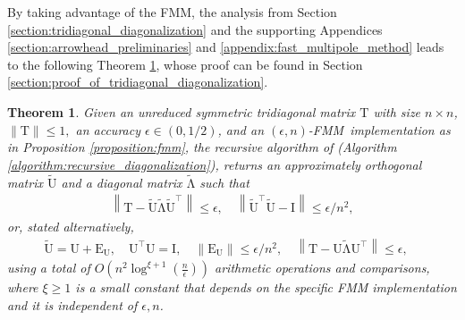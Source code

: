 \documentclass{article}
\newcommand{\lnorm}{\left\|}
\newcommand{\rnorm}{\right\|}
\newcommand{\lpar}{\left(}
\newcommand{\rpar}{\right)}
\newtheorem{theorem}{Theorem}[section]
\newcommand\matE{\boldsymbol{\mathrm{E}}}
\newcommand\matI{\boldsymbol{\mathrm{I}}}
\newcommand\matT{\boldsymbol{\mathrm{T}}}
\newcommand\matU{\boldsymbol{\mathrm{U}}}
\newcommand\matUtilde{\widetilde{\boldsymbol{\mathrm{U}}}}
\newcommand\matLambdatilde{\widetilde{\boldsymbol{\mathrm{\Lambda}}}}
\newcommand{\cfmm}{\xi}
\newcommand{\fmmalgo}{FMM} \usepackage[utf8]{inputenc}
\begin{document}
By taking advantage of the FMM, the analysis from Section \ref{section:tridiagonal_diagonalization} and the supporting Appendices \ref{section:arrowhead_preliminaries} and \ref{appendix:fast_multipole_method} leads to the following Theorem \ref{theorem:alg_recursive_diagonalization}, whose proof can be found in Section \ref{section:proof_of_tridiagonal_diagonalization}.    
\begin{theorem}
    \label{theorem:alg_recursive_diagonalization}
    Given an unreduced symmetric tridiagonal matrix $\matT$ with size $n\times n$, $\|\matT\|\leq 1,$ an accuracy $\epsilon\in(0,1/2)$, and an $(\epsilon,n)$-\fmmalgo\   implementation as in Proposition \ref{proposition:fmm},  the recursive algorithm of \cite{gu1995divide} (Algorithm \ref{algorithm:recursive_diagonalization}), returns an approximately orthogonal matrix $\matUtilde$ and a diagonal matrix $\matLambdatilde$ such that
    \begin{align*}
        \lnorm \matT - \matUtilde\matLambdatilde\matUtilde^\top \rnorm \leq \epsilon,
        \quad
        \lnorm \matUtilde^\top \matUtilde - \matI \rnorm \leq \epsilon/n^2,
    \end{align*}
    or, stated alternatively,
    \begin{align*}
        \matUtilde=\matU+\matE_{\matU},
        \quad
        \matU^\top\matU=\matI,
        \quad
        \lnorm \matE_{\matU} \rnorm \leq \epsilon/n^2,
        \quad
        \lnorm \matT - \matU\matLambdatilde\matU^\top \rnorm \leq \epsilon,
        \quad
    \end{align*}
    using a total of $O\lpar n^2\log^{\cfmm+1}(\tfrac{n}{\epsilon})\rpar$ arithmetic operations and comparisons, where $\xi\geq 1$ is a small constant that depends on the specific FMM implementation and it is independent of $\epsilon,n$.
   
\end{theorem}
\end{document}
